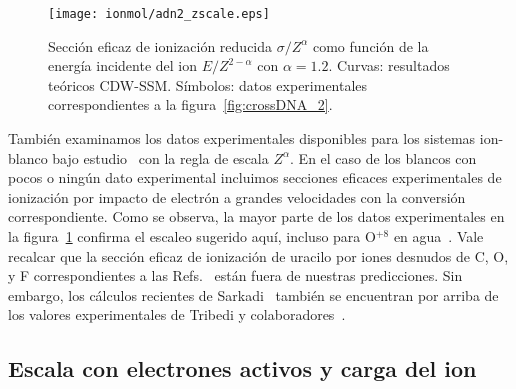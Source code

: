 \begin{figure}
\centering
\texttt{[image: ionmol/adn2\_zscale.eps]}
\caption[Sección eficaz de ionización reducida por $Z$ y $\alpha$ 
(Parte II).]
{Sección eficaz de ionización reducida $\sigma/Z^{\alpha}$ como función
de la energía incidente del ion $E/Z^{2-\alpha}$ con $\alpha=1.2$. 
Curvas: resultados teóricos CDW-SSM. 
Símbolos: datos experimentales correspondientes a la 
figura~\ref{fig:crossDNA_2}.}
\label{fig:zreduced}
\end{figure} 

También examinamos los datos experimentales disponibles para los sistemas
ion-blanco bajo estudio~\cite{itoh2013,iriki2011,wolff2014,wang2016,
Bhattacharjee2019,agnihotri2012,agnihotri2013,Luna2007,Bolorizadeh86,
H_Rudd85,toburen80,Ohsawa05,Bhattacharjee17,DalCappello2009,Tribedi_O_water} 
con la regla de escala $Z^\alpha$. 
En el caso de los blancos con pocos o ningún dato experimental incluimos 
secciones eficaces experimentales de ionización por impacto de electrón 
\cite{rahman2016,bug2017,wolf2019,fuss2009} a grandes velocidades con la
conversión correspondiente. Como se observa, la mayor parte de los datos
experimentales en la figura~\ref{fig:zreduced} confirma el escaleo 
sugerido aquí, incluso para O$^{+8}$ en agua~\cite{Tribedi_O_water}. 
Vale recalcar que la sección eficaz de ionización de uracilo por 
iones desnudos de C, O, y F correspondientes a las 
Refs.~\cite{agnihotri2012,agnihotri2013} están fuera de nuestras 
predicciones. Sin embargo, los cálculos recientes de 
Sarkadi~\cite{sarkadi2016} también se encuentran por arriba de los 
valores experimentales de Tribedi y 
colaboradores~\cite{agnihotri2012,agnihotri2013}.

\subsection{Escala con electrones activos y carga del ion}
\label{sec:nez_scaling}

